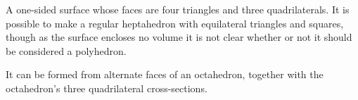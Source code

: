  A one-sided surface whose faces are four triangles and three
quadrilaterals. It is possible to make a regular heptahedron
with equilateral triangles and squares, though as the
surface encloses no volume it is not clear whether or
not it should be considered a polyhedron. 
\par
It can be formed from alternate faces of an octahedron, together
with the octahedron's three quadrilateral cross-sections.
